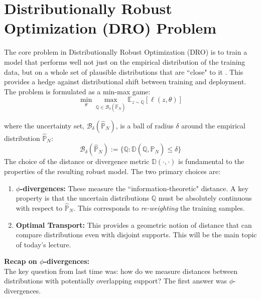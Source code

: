 \documentclass[12pt]{report}
\newcommand{\coloneqq}{\mathrel{:=}}
\begin{document}
\maketitle

\section{Distributionally Robust Optimization (DRO) Problem}
The core problem in Distributionally Robust Optimization (DRO) is to train a model that performs well not just on the empirical distribution of the training data, but on a whole set of plausible distributions that are ``close" to it \citep{blanchet2024distributionally}. This provides a hedge against distributional shift between training and deployment. The problem is formulated as a min-max game:
\[
    \min_{\theta} \max_{\mathbb{Q} \in \mathcal{B}_\delta(\hat{\mathbb{P}}_N)} \mathbb{E}_{z \sim \mathbb{Q}} [\ell(z,\theta)]
\]

where the uncertainty set, $\mathcal{B}_\delta(\hat{\mathbb{P}}_N)$, is a ball of radius $\delta$ around the empirical distribution $\hat{\mathbb{P}}_N$:
\[
\mathcal{B}_\delta(\hat{\mathbb{P}}_N) \coloneqq \{ \mathbb{Q}:\mathbb{D}(\mathbb{Q}, \hat{\mathbb{P}}_N)\leq \delta \}
\]
The choice of the distance or divergence metric $\mathbb{D}(\cdot, \cdot)$ is fundamental to the properties of the resulting robust model. The two primary choices are:
\begin{enumerate}
    \item \textbf{$\phi$-divergences:} These measure the ``information-theoretic" distance. A key property is that the uncertain distributions $\mathbb{Q}$ must be absolutely continuous with respect to $\hat{\mathbb{P}}_N$. This corresponds to \textit{re-weighting} the training samples.
    \item \textbf{Optimal Transport:} This provides a geometric notion of distance that can compare distributions even with disjoint supports. This will be the main topic of today's lecture.
\end{enumerate}

\noindent\textbf{Recap on $\phi$-divergences:}\\
The key question from last time was: how do we measure distances between distributions with potentially overlapping support? The first answer was $\phi$-divergences.
\end{document}
